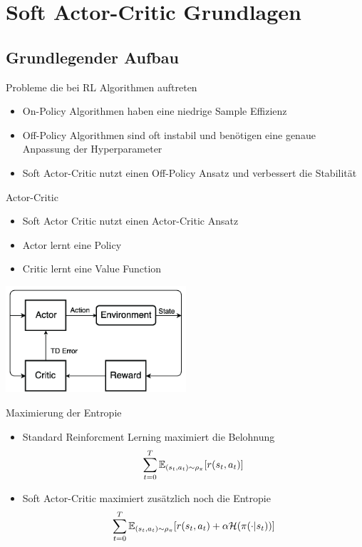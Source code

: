 \section{Soft Actor-Critic Grundlagen}
\subsection{Grundlegender Aufbau}
\begin{frame}{Probleme die bei RL Algorithmen auftreten}
	\begin{itemize}
		\item On-Policy Algorithmen haben eine niedrige Sample Effizienz  
		\item Off-Policy Algorithmen sind oft instabil und benötigen eine genaue Anpassung der Hyperparameter
		\item Soft Actor-Critic nutzt einen Off-Policy Ansatz und verbessert die Stabilität
	\end{itemize} 
\end{frame}

\begin{frame}{Actor-Critic}
	\begin{itemize}
		\item Soft Actor Critic nutzt einen Actor-Critic Ansatz
		\item Actor lernt eine Policy
		\item Critic lernt eine Value Function
	\end{itemize} 
	\includegraphics[width=190pt]{figures/A-regular-actor-critic-model-TD-temporal-difference.png}
\end{frame}

\begin{frame}{Maximierung der Entropie}
	\begin{itemize}
		\item Standard Reinforcment Lerning maximiert die Belohnung
		\begin{equation}
			\sum_{t=0}^T \mathbb{E}_{(s_t,a_t)\sim\rho_\pi}[{\mathnormal{r}(s_t,a_t)}] \notag
		\end{equation}
		\item Soft Actor-Critic maximiert zusätzlich noch die Entropie
		\begin{equation}
			\sum_{t=0}^T \mathbb{E}_{(s_t,a_t)\sim\rho_\pi}[{\mathnormal{r}(s_t,a_t)} + \alpha \mathcal{H}(\pi(\cdot|s_t))] \notag
		\end{equation}
	\end{itemize} 
\end{frame}
